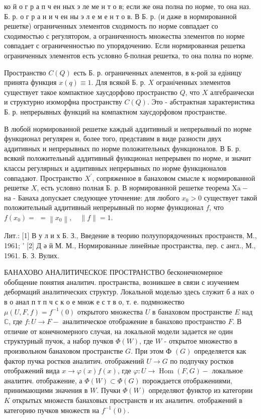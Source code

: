 \documentclass[10pt]{article}
\begin{document}
ко й о г р а п ч ен ных э ле ме н т о в; если же она полна по норме, то она наз. Б. р. о г р а н и ч ен ны э л е м е н т о в. В Б. р. (и даже в нормированной решетке) ограниченных элементов сходимость по норме совпадает со сходимостью с регулятором, а ограниченность множества элементов по норме совпадает с ограниченностью по упорядочению. Если нормированная решетка ограниченных элементов есть условно б-полная решетка, то она полна по норме.



Пространство $C(Q)$ есть Б. р. ограниченных әлементов, в к-рой за едіницу принята функция $x(q) \equiv 1$. Для всякой Б. р. $X$ ограніченных элементов существует такое компактное хаусдорфово пространство $Q$, что $X$ алгебраически и структурно изоморфна пространству $C(Q)$. Это - абстрактная характеристика Б. р. непрерывных функций на компактном хаусдорфовом пространстве.



В любой нормированной решетке каждый аддитивный и непрерывный по норме функционал регулярен и, более того, представим в виде разности двух аддитивных и непрерывных по норме положительных функционалов. В Б. р. всякий положительный аддитивный функционал непрерывен по норме, и значит классы регулярных и аддитивных непрерывных по норме функционалов совпадают. Пространство $X^{\prime}$, сопряженное в банаховом смысле к нормированной решетке $X$, есть условно полная Б. р. В нормированной решетке теорема $\mathrm{Xa-}$ на - Банаха допускает следующее уточнение: для любого $x_{0}>0$ существует такой положительный аддитивный непрерывный по норме функционал $f$, что $f\left(x_{0}\right)=$ $=\left\|x_{0}\right\|, \quad\|f\|=1$.



Лит.: [1] В у л и х Б. З., Введение в теорию полуупорядоченных пространств, М., 1961; ' [2] Д ә й М. М., Нормированные линейные пространства, пер. с англ., М., 1961. Б. З. Вулих.



БАНАХОВО АНАЛИТИЧЕСКОЕ ПРОСТРАНСТВО бесконечномерное обобщение понятия аналитич. пространства, возникшее в связи с изучением дебормаций аналитических структур. Локальной моделью здесь служит б а нах о в о анал п т п ч с к о е множ е с т в о, т. е. подмножество $\mu(U, F, f)=f^{-1}(0)$ открытого множества $U$ в банаховом пространстве $E$ над $\mathbb{C}$, где $f: U \rightarrow F-$ аналитическое отображение в банахово пространство $F$. В отличие от конечномерного случая, на локальной модели задается не один структурный пучок, а набор пучков $\Phi(W)$, где $W$ - открытое множество в произвольном банаховом пространстве $G$. При этом Ф $(G)$ определяется как фактор пучка ростков аналитич. отображений $U \rightarrow G$ по подпучку ростков отображений вида $x \rightarrow \varphi(x) f(x)$, где $\varphi: U \rightarrow \operatorname{Hom}(F, G)-$ локальное аналитич. отображение, а $\Phi(W) \subset \Phi(G)$ порождается отображениями, принимающими значения в $W$. Пучки $\Phi(W)$ определяют функтор из категории $K$ открытых множеств банаховых пространств и их аналитич. отображений в категорию пучков множеств на $f^{-1}(0)$.
\end{document}
